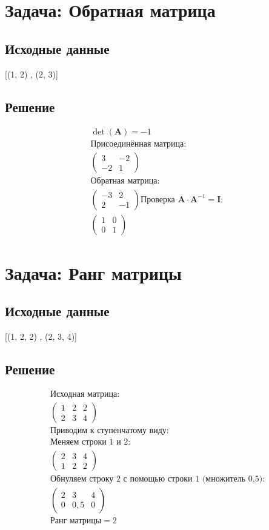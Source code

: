 \documentclass{article}
\begin{document}
\section{Задача: Обратная матрица}
\subsection{Исходные данные}
[(1, 2) ,  (2, 3)]
\subsection{Решение}
\begin{align*}
\det(\mathbf{A}) = -1\\
\text{Присоединённая матрица:}\\
\begin{pmatrix}
3 & -2\\
-2 & 1\end{pmatrix}
\\
\text{Обратная матрица:}\\
\begin{pmatrix}
-3 & 2\\
2 & -1\end{pmatrix}
\text{Проверка } \mathbf{A} \cdot \mathbf{A}^{-1} = \mathbf{I}:\\
\begin{pmatrix}
1 & 0\\
0 & 1\end{pmatrix}
\end{align*}
\section{Задача: Ранг матрицы}
\subsection{Исходные данные}
[(1, 2, 2) ,  (2, 3, 4)]
\subsection{Решение}
\begin{align*}
\text{Исходная матрица:}\\
\begin{pmatrix}
1 & 2 & 2\\
2 & 3 & 4\end{pmatrix}
\\
\text{Приводим к ступенчатому виду:}\\
\text{Меняем строки 1 и 2:}\\
\begin{pmatrix}
2 & 3 & 4\\
1 & 2 & 2\end{pmatrix}
\\
\text{Обнуляем строку 2 с помощью строки 1 (множитель 0,5):}\\
\begin{pmatrix}
2 & 3 & 4\\
0 & 0,5 & 0\end{pmatrix}
\\
\text{Ранг матрицы} = 2
\end{align*}
\end{document}
